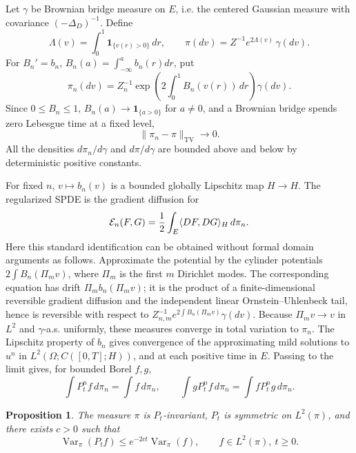 \documentclass[12pt]{article}
\newtheorem{proposition}{Proposition}
\newcommand{\1}{\mathbf 1}
\newcommand{\Var}{\operatorname{Var}}
\newcommand{\TV}{\operatorname{TV}}
\begin{document}
Let \(\gamma\) be Brownian bridge measure on \(E\), i.e. the centered Gaussian
measure with covariance \((-\Delta_D)^{-1}\).  Define
\[
  \Lambda(v)=\int_0^1\1_{\{v(r)>0\}}\,dr,\qquad
  \pi(dv)=Z^{-1}e^{2\Lambda(v)}\,\gamma(dv).                 \tag{12}
\]
For \(B_n'=b_n\), \(B_n(a)=\int_{-\infty}^ab_n(r)dr\), put
\[
   \pi_n(dv)=Z_n^{-1}\exp\left(2\int_0^1B_n(v(r))\,dr\right)\gamma(dv).
\]
Since \(0\le B_n\le1\), \(B_n(a)\to\1_{\{a>0\}}\) for \(a\ne0\), and a
Brownian bridge spends zero Lebesgue time at a fixed level,
\[
        \|\pi_n-\pi\|_{\TV}\to0 .                            \tag{13}
\]
All the densities \(d\pi_n/d\gamma\) and \(d\pi/d\gamma\) are bounded above
and below by deterministic positive constants.

For fixed \(n\), \(v\mapsto b_n(v)\) is a bounded globally Lipschitz map
\(H\to H\).  The regularized SPDE is the gradient diffusion for
\[
        {\cal E}_n(F,G)=\frac12\int_E\langle DF,DG\rangle_H\,d\pi_n .
\]
Here this standard identification can be obtained without formal domain
arguments as follows.  Approximate the potential by the cylinder potentials
\(2\int B_n(\Pi_m v)\), where \(\Pi_m\) is the first \(m\) Dirichlet modes.
The corresponding equation has drift \(\Pi_m b_n(\Pi_m v)\); it is the product
of a finite-dimensional reversible gradient diffusion and the independent
linear Ornstein--Uhlenbeck tail, hence is reversible with respect to
\(Z_{n,m}^{-1}e^{2\int B_n(\Pi_m v)}\gamma(dv)\).  Because
\(\Pi_m v\to v\) in \(L^2\) and \(\gamma\)-a.s. uniformly, these measures
converge in total variation to \(\pi_n\).  The Lipschitz property of \(b_n\)
gives convergence of the approximating mild solutions to \(u^n\) in
\(L^2(\Omega;C([0,T];H))\), and at each positive time in \(E\).  Passing to the
limit gives, for bounded Borel \(f,g\),
\[
       \int P_t^nf\,d\pi_n=\int f\,d\pi_n,\qquad
       \int gP_t^nf\,d\pi_n=\int fP_t^ng\,d\pi_n .           \tag{14}
\]

\begin{proposition}\label{prop:gap}
The measure \(\pi\) is \(P_t\)-invariant, \(P_t\) is symmetric on
\(L^2(\pi)\), and there exists \(c>0\) such that
\[
       \Var_\pi(P_t f)\le e^{-2ct}\Var_\pi(f),
       \qquad f\in L^2(\pi),\ t\ge0 .                       \tag{15}
\]
\end{proposition}
\end{document}
